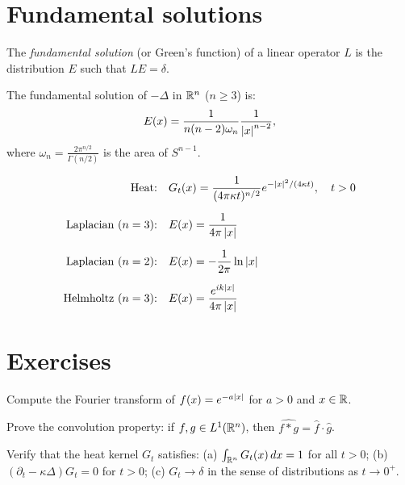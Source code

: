 \section{Fundamental solutions}

\begin{definition}
The \emph{fundamental solution} (or Green's function) of a linear operator $L$
is the distribution $E$ such that $LE = \delta$.
\end{definition}

\begin{example}
The fundamental solution of $-\Delta$ in $\mathbb{R}^n$ ($n \geq 3$) is:
\[
    E(x) = \frac{1}{n(n-2)\omega_n} \frac{1}{\left| x \right|^{n-2}},
\]
where $\omega_n = \frac{2\pi^{n/2}}{\Gamma(n/2)}$ is the area of $S^{n-1}$.
\end{example}

\begin{keyformulas}[title=\textbf{Fundamental solutions of classical PDEs}]
\begin{align*}
    \text{Heat:} \quad & G_t(x) = \frac{1}{(4\pi \kappa t)^{n/2}}
        e^{-\left| x \right|^2/(4\kappa t)}, \quad t > 0 \\[6pt]
    \text{Laplacian ($n=3$):} \quad & E(x) = \frac{1}{4\pi \left| x \right|} \\[6pt]
    \text{Laplacian ($n=2$):} \quad & E(x) = -\frac{1}{2\pi}\ln\left| x \right| \\[6pt]
    \text{Helmholtz ($n=3$):} \quad & E(x) = \frac{e^{ik\left| x \right|}}{4\pi \left| x \right|}
\end{align*}
\end{keyformulas}

\section{Exercises}

\begin{exercise}
Compute the Fourier transform of $f(x) = e^{-a\left| x \right|}$ for $a > 0$ and $x \in \mathbb{R}$.
\end{exercise}

\begin{exercise}
Prove the convolution property: if $f, g \in L^1(\mathbb{R}^n)$, then
$\widehat{f * g} = \hat{f} \cdot \hat{g}$.
\end{exercise}

\begin{exercise}
Verify that the heat kernel $G_t$ satisfies:
(a) $\int_{\mathbb{R}^n} G_t(x)\, dx = 1$ for all $t > 0$;
(b) $(\partial_t - \kappa \Delta)G_t = 0$ for $t > 0$;
(c) $G_t \to \delta$ in the sense of distributions as $t \to 0^+$.
\end{exercise}

